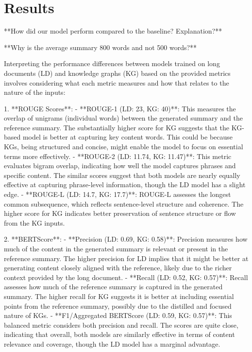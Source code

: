 \documentclass[12pt]{article}
\begin{document}
\section{Results}
**How did our model perform compared to the baseline? Explanation?**

**Why is the average summary 800 words and not 500 words?**

Interpreting the performance differences between models trained on long documents (LD) and knowledge graphs (KG) based on the  provided metrics involves considering what each metric measures and how that relates to the nature of the inputs:

1. **ROUGE Scores**:
   - **ROUGE-1 (LD: 23, KG: 40)**: This measures the overlap of unigrams (individual words) between the generated summary and the reference summary. The substantially higher score for KG suggests that the KG-based model is better at capturing key content words. This could be because KGs, being structured and concise, might enable the model to focus on essential terms more effectively.
   - **ROUGE-2 (LD: 11.74, KG: 11.47)**: This metric evaluates bigram overlap, indicating how well the model captures phrases and specific content. The similar scores suggest that both models are nearly equally effective at capturing phrase-level information, though the LD model has a slight edge.
   - **ROUGE-L (LD: 14.7, KG: 17.7)**: ROUGE-L assesses the longest common subsequence, which reflects sentence-level structure and coherence. The higher score for KG indicates better preservation of sentence structure or flow from the KG inputs.

2. **BERTScore**:
   - **Precision (LD: 0.69, KG: 0.58)**: Precision measures how much of the content in the generated summary is relevant or present in the reference summary. The higher precision for LD implies that it might be better at generating content closely aligned with the reference, likely due to the richer context provided by the long document.
   - **Recall (LD: 0.52, KG: 0.57)**: Recall assesses how much of the reference summary is captured in the generated summary. The higher recall for KG suggests it is better at including essential points from the reference summary, possibly due to the distilled and focused nature of KGs.
   - **F1/Aggregated BERTScore (LD: 0.59, KG: 0.57)**: This balanced metric considers both precision and recall. The scores are quite close, indicating that overall, both models are similarly effective in terms of content relevance and coverage, though the LD model has a marginal advantage.
\end{document}
